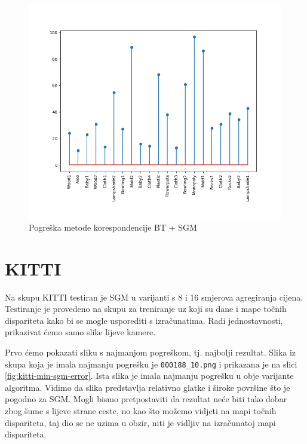 \documentclass[utf8, zavrsni, numeric]{fer}
\begin{document}
\begin{figure}[H]
  \centering
  \includegraphics[width=13cm]{img/sgm_bt_middlebury.png}
  \caption{Pogreška metode korespondencije BT + SGM}
  \label{fig:bt-sgm-error}
\end{figure}

\section{KITTI}
Na skupu KITTI testiran je SGM u varijanti s 8 i 16 smjerova agregiranja cijena.
Testiranje je provedeno na skupu za treniranje uz koji su dane i mape točnih dispariteta
kako bi se mogle usporediti s izračunatima. Radi jednostavnosti, prikazivat ćemo samo slike
lijeve kamere.

Prvo ćemo pokazati sliku s najmanjom pogreškom, tj. najbolji rezultat. Slika iz skupa koja je imala najmanju
pogrešku je {\verb|000188_10.png|} i prikazana je na slici \ref{fig:kitti-min-sgm-error}.
Ista slika je imala najmanju pogrešku u obje varijante algoritma. Vidimo da slika predstavlja
relativno glatke i široke površine što je pogodno za SGM. Mogli bismo pretpostaviti da rezultat neće biti tako dobar
zbog šume s lijeve strane ceste, no kao što možemo vidjeti na mapi točnih dispariteta, taj dio
se ne uzima u obzir, niti je vidljiv na izračunatoj mapi dispariteta.
\end{document}
